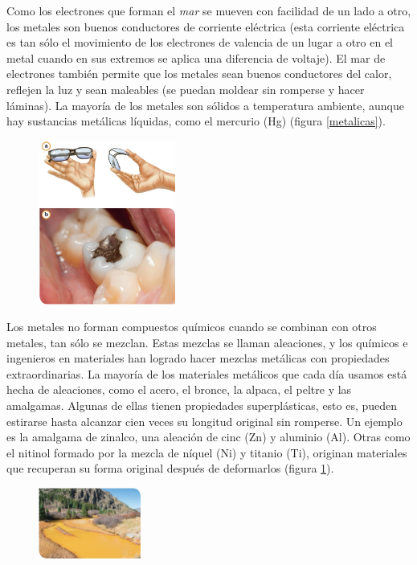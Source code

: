 \documentclass[11pt]{book}
\begin{document}
Como los electrones que forman el \emph{mar} se mueven con facilidad de un lado a otro, los metales
son buenos conductores de corriente eléctrica (esta corriente eléctrica es tan sólo el movimiento de los electrones de valencia de un lugar a otro en el metal cuando en sus extremos se aplica una diferencia de voltaje). El mar de electrones también permite que los metales sean buenos conductores del calor, reflejen la luz y sean maleables (se puedan moldear sin romperse y hacer láminas). La mayoría de los metales son sólidos a temperatura ambiente, aunque hay sustancias metálicas líquidas, como el mercurio (Hg) (figura \ref{metalicas}).

\begin{figure}
  \centering
  \includegraphics[width=0.4\textwidth]{metalicas2.jpg}
  \label{fig:metalicas2}
\end{figure}

Los metales no forman compuestos químicos cuando se combinan con otros metales, tan sólo se mezclan.
Estas mezclas se llaman aleaciones, y los químicos e ingenieros en materiales han logrado
hacer mezclas metálicas con propiedades extraordinarias. La mayoría de los materiales metálicos
que cada día usamos está hecha de aleaciones, como el acero, el bronce, la alpaca, el peltre y
las amalgamas. Algunas de ellas tienen propiedades superplásticas, esto es, pueden estirarse
hasta alcanzar cien veces su longitud original sin romperse. Un ejemplo es la amalgama de zinalco,
una aleación de cinc (Zn) y aluminio (Al). Otras como el nitinol formado por la mezcla de níquel (Ni)
y titanio (Ti), originan materiales que recuperan su forma original después de deformarlos (figura \ref{fig:metalicas2}).

\begin{figure}
  \centering
  \includegraphics[width=0.3\textwidth]{metalicas3.jpg}
  \label{fig:metalicas3}
\end{figure}
\end{document}
